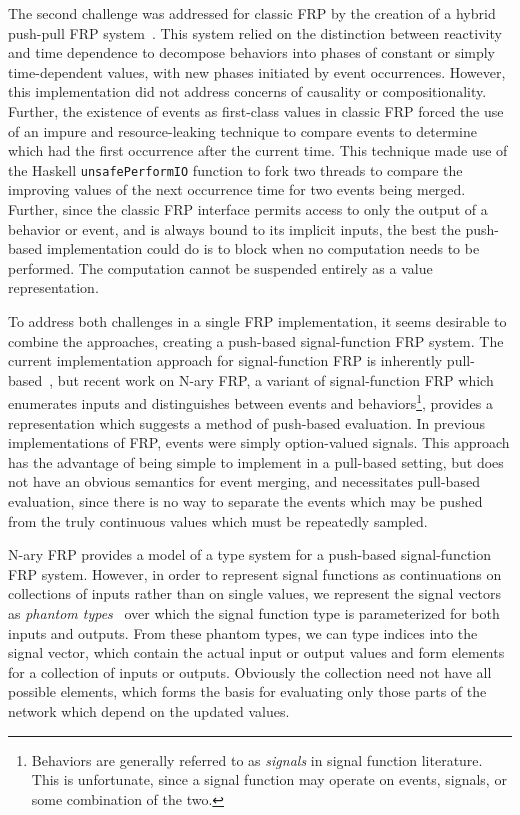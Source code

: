The second challenge was addressed for classic FRP by the creation of a hybrid push-pull FRP system~\cite{Elliott2009}. This system relied
on the distinction between reactivity and time dependence to decompose behaviors into phases of constant or simply time-dependent values,
with new phases initiated by event occurrences. However, this implementation did not address concerns of causality or compositionality.
Further, the existence of events as first-class values in classic FRP forced the use of an impure and resource-leaking technique to compare
events to determine which had the first occurrence after the current time. This technique made use of the Haskell {\tt unsafePerformIO} function
to fork two threads to compare the improving values of the next occurrence time for two events being merged. Further, since the classic FRP
interface permits access to only the output of a behavior or event, and is always bound to its implicit inputs, the best the push-based implementation
could do is to block when no computation needs to be performed. The computation cannot be suspended entirely as a value representation.

To address both challenges in a single FRP implementation, it seems desirable to combine the approaches, creating a push-based
signal-function FRP system. The current implementation approach for signal-function FRP is inherently pull-based~\cite{Nilsson2002}, but
recent work on N-ary FRP, a variant of signal-function FRP which enumerates inputs and distinguishes between events and behaviors\footnote{Behaviors are generally
referred to as {\em signals} in signal function literature. This is unfortunate, since a signal function may operate on events, signals, or some combination of the
two.}, provides a representation which suggests a method of push-based evaluation. In previous implementations of FRP, events were simply
option-valued signals. This approach has the advantage of being simple to implement in a pull-based setting, but does not have an obvious
semantics for event merging, and necessitates pull-based evaluation, since there is no way to separate the events which may be pushed from
the truly continuous values which must be repeatedly sampled.

N-ary FRP provides a model of a type system for a push-based signal-function FRP system. However, in order to represent signal functions
as continuations on collections of inputs rather than on single values, we represent the signal vectors as {\em phantom types}~\cite{Cheney03} over which
the signal function type is parameterized for both inputs and outputs. From these phantom types, we can type indices into the signal vector, which
contain the actual input or output values and form elements for a collection of inputs or outputs. Obviously the collection need not have all possible elements,
which forms the basis for evaluating only those parts of the network which depend on the updated values.